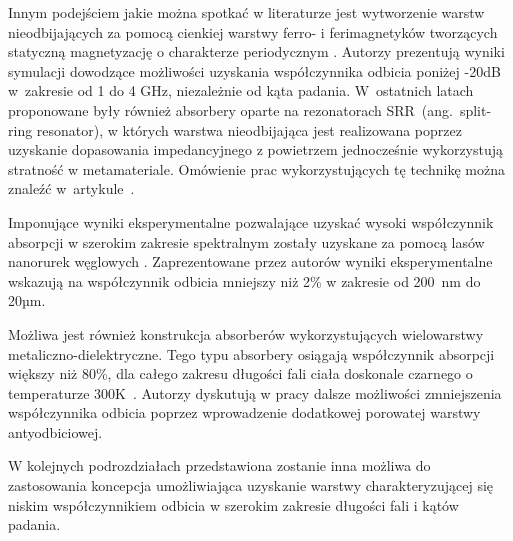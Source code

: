 Innym podejściem jakie można spotkać w literaturze jest wytworzenie warstw nieodbijających za pomocą cienkiej warstwy ferro- i ferimagnetyków tworzących  statyczną magnetyzację o charakterze periodycznym   \cite{ramprecht2008scattering}. Autorzy prezentują wyniki symulacji dowodzące możliwości uzyskania współczynnika odbicia poniżej -20dB w~zakresie od 1 do 4 GHz, niezależnie od kąta padania. W~ostatnich latach proponowane były również absorbery oparte na rezonatorach SRR~(ang.~split-ring resonator), w których warstwa nieodbijająca jest realizowana poprzez uzyskanie dopasowania impedancyjnego z powietrzem jednocześnie wykorzystują stratność w metamateriale. Omówienie prac wykorzystujących tę technikę  można znaleźć w~artykule~\cite{watts2012metamaterial}.

Imponujące wyniki eksperymentalne pozwalające uzyskać wysoki współczynnik absorpcji w szerokim zakresie spektralnym zostały uzyskane za pomocą lasów nanorurek węglowych \cite{mizuno2009black}. Zaprezentowane przez autorów wyniki eksperymentalne wskazują na współczynnik odbicia mniejszy niż 2\% w zakresie od 200~nm do 20µm.

Możliwa jest również konstrukcja absorberów wykorzystujących wielowarstwy metaliczno-dielektryczne. Tego typu absorbery osiągają współczynnik absorpcji większy niż 80\%, dla całego zakresu długości fali ciała doskonale czarnego o temperaturze 300K~\cite{guo2014impact,corrigan2012broadband}. Autorzy dyskutują w pracy dalsze możliwości zmniejszenia współczynnika odbicia poprzez wprowadzenie dodatkowej porowatej warstwy antyodbiciowej. 

W kolejnych podrozdziałach przedstawiona zostanie inna możliwa do zastosowania koncepcja umożliwiająca uzyskanie warstwy charakteryzującej się niskim współczynnikiem odbicia w szerokim zakresie długości fali i kątów padania. 
